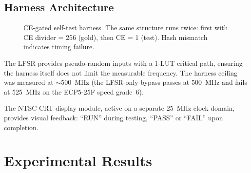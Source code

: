 \documentclass[10pt,twocolumn]{article}
\begin{document}
\subsection{Harness Architecture}

\begin{figure}[t]
\centering
{}
\caption{CE-gated self-test harness.  The same structure runs twice:
first with CE divider = 256 (gold), then CE = 1 (test).  Hash mismatch
indicates timing failure.}
\label{fig:harness}
\end{figure}

The LFSR provides pseudo-random inputs with a 1-LUT critical path,
ensuring the harness itself does not limit the measurable frequency.
The harness ceiling was measured at $\sim$500~MHz (the LFSR-only
bypass passes at 500~MHz and fails at 525~MHz on the ECP5-25F
speed grade~6).

The NTSC CRT display module, active on a separate 25~MHz clock domain,
provides visual feedback: ``RUN'' during testing, ``PASS'' or ``FAIL''
upon completion.

\section{Experimental Results}
\label{sec:results}
\end{document}
